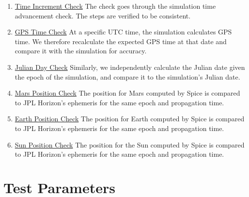 \documentclass[]{BasiliskReportMemo}
\begin{document}
\begin{enumerate}
\item \underline{Time Increment Check} The check goes through the simulation time advancement check. The steps are verified to be consistent. 
\item \underline{GPS Time Check} At a specific UTC time, the simulation calculates GPS time. We therefore recalculate the expected GPS time at that date and compare it with the simulation for accuracy. 
\item \underline{Julian Day Check} Similarly, we independently calculate the Julian date given the epoch of the simulation, and compare it to the simulation's Julian date.
\item \underline{Mars Position Check} The position for Mars computed by Spice is compared to JPL Horizon's ephemeris for the same epoch and propagation time.
\item \underline{Earth Position Check} The position for Earth computed by Spice is compared to JPL Horizon's ephemeris for the same epoch and propagation time.
\item \underline{Sun Position Check} The position for the Sun computed by Spice is compared to JPL Horizon's ephemeris for the same epoch and propagation time.
\end{enumerate} 


\section{Test Parameters}
\end{document}
